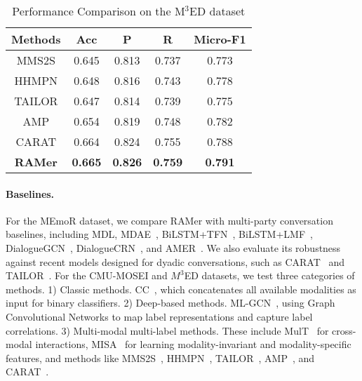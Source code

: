 \begin{table}[t]
\begin{center}
\caption{Performance Comparison on the M$^3$ED dataset} \label{tab:m3ed} 
\vspace{-1em}
\small
\begin{tabular}{ccccc}
\hline
\hline
Methods & Acc   & P     & R     & Micro-F1 \\ 
\hline
MMS2S   & 0.645 & 0.813 & 0.737 & 0.773    \\
HHMPN   & 0.648 & 0.816 & 0.743 & 0.778    \\
TAILOR  & 0.647 & 0.814 & 0.739 & 0.775    \\
AMP     & 0.654 & 0.819 & 0.748 & 0.782    \\
CARAT   & 0.664 & 0.824 & 0.755 & 0.788    \\ 
\hline
\textbf{RAMer}  & \textbf{0.665} & \textbf{0.826} & \textbf{0.759} & \textbf{0.791}     \\ 
\hline
\hline
\end{tabular}
\end{center}
\vspace{-1em}
\end{table}


\paragraph{Baselines.}
For the MEmoR dataset, we compare RAMer with multi-party conversation baselines, including MDL, MDAE~\cite{MDAE}, BiLSTM+TFN~\cite{TFN}, BiLSTM+LMF~\cite{LMF}, DialogueGCN~\cite{Dialoguegcn}, DialogueCRN~\cite{DialogueCRN}, and AMER~\cite{MEmoR}. We also evaluate its robustness against recent models designed for dyadic conversations, such as CARAT~\cite{CARAT} and TAILOR~\cite{Tailor}. For the CMU-MOSEI and $M^3$ED datasets, we test three categories of methods. 1) Classic methods. CC~\cite{CC}, which concatenates all available modalities as input for binary classifiers. 2) Deep-based methods. ML-GCN~\cite{chen2019multi}, using Graph Convolutional Networks to map label representations and capture label correlations. 3) Multi-modal multi-label methods. These include MulT~\cite{cross_adaptation} for cross-modal interactions, MISA~\cite{MISA} for learning modality-invariant and modality-specific features, and methods like MMS2S~\cite{MMER1}, HHMPN~\cite{MMER2}, TAILOR~\cite{Tailor}, AMP~\cite{adversarial_masking}, and CARAT~\cite{CARAT}.
% 



